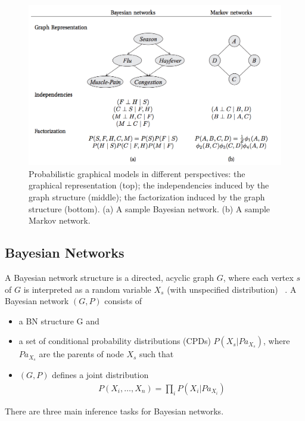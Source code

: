\begin{figure}
    \centering
    \includegraphics[width=\textwidth]{figures/pgm.png}
    \caption{Probabilistic graphical models in different perspectives: the graphical representation (top); the independencies induced by the graph structure (middle); the factorization induced by the graph structure (bottom). (a) A sample Bayesian network. (b) A sample Markov network.}
    \label{fig:pgm}
\end{figure}


\subsection{Bayesian Networks}
A Bayesian network structure is a directed, acyclic graph $G$, where each vertex $s$ of $G$ is interpreted as a random variable $X_s$ (with unspecified distribution) ~\cite{heckerman}.
A Bayesian network $(G, P)$ consists of
\begin{itemize}
  \item a BN structure G and
  \item a set of conditional probability distributions (CPDs) $P(X_s | Pa_{X_s})$, where $Pa_{X_s}$ are the parents of node $X_s$ such that 
  \item $(G, P)$ defines a joint distribution
  \begin{align*}
    P(X_i, \dots, X_n) = \prod_i P(X_i | Pa_{X_i})
  \end{align*}
\end{itemize}
There are three main inference tasks for Bayesian networks.

